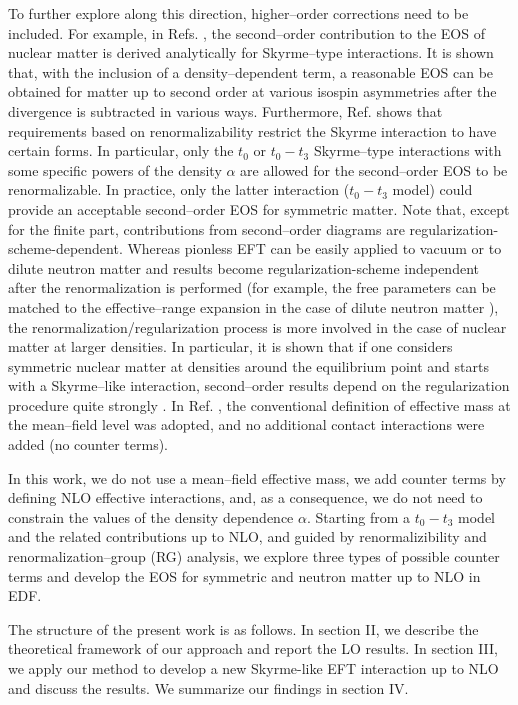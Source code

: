 \documentclass[aps,11pt,prc,preprint,superscriptaddress,nofootinbib]{revtex4}
\begin{document}
To further
explore along this direction, higher--order corrections need to be included. 
For example, in
Refs. \cite{mog,ym,kaiser,mog1}, the second--order contribution to the EOS of nuclear matter is derived 
analytically for Skyrme--type interactions. It is shown that, with
the inclusion of a density--dependent term, a reasonable 
EOS can be obtained for matter up to second order at various isospin asymmetries after the divergence is subtracted in various ways.
Furthermore, Ref. \cite{bira} shows that requirements based on renormalizability
restrict the Skyrme interaction to have certain forms. In particular, only the $t_{0}$ or $t_{0}-t_{3}$ Skyrme--type interactions with some specific powers of the density $\alpha$ are allowed for the second--order EOS to be renormalizable. In practice, only the latter interaction ($t_{0}-t_{3}$ model) could provide an acceptable second--order EOS for symmetric matter. Note that, except for the finite part, contributions from second--order diagrams are regularization-scheme-dependent. Whereas pionless EFT can be easily 
applied to vacuum or to dilute neutron matter and results become regularization-scheme independent after the renormalization is performed (for example, the free parameters can be matched to the effective--range expansion in the case of dilute neutron matter \cite{lee,hammer,hammerlucas,Fur12,pug,fur,bishop}), the renormalization/regularization process is more involved in the case of nuclear matter at larger densities. In particular, it is shown that if one considers symmetric nuclear matter at densities 
around the equilibrium point and starts with a Skyrme--like interaction, second--order results
 depend on the regularization procedure quite strongly \cite{bira}. In Ref. \cite{bira}, the conventional definition of effective mass at the mean--field level was adopted, and no additional contact interactions were added (no counter terms).  
 
In this work, we do not use a mean--field effective mass, we add counter terms by defining NLO effective interactions, and, as a consequence, we do not need to constrain the values of the density dependence $\alpha$. Starting from a $t_0-t_3$ model and the related contributions up to NLO, and guided by 
renormalizibility and renormalization--group (RG) analysis, we explore three types of possible counter terms and
develop the EOS for symmetric and neutron matter up to NLO in EDF.

The structure of the present work is as follows. In section II, we describe
the theoretical framework of our approach and report the LO results. In section III, we apply our
method to develop a new Skyrme-like EFT interaction up to NLO 
and discuss the results. We summarize our findings in section IV.
\end{document}
